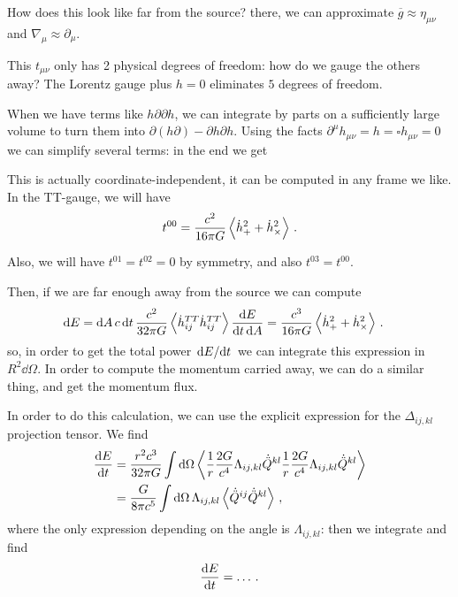 \documentclass[main.tex]{subfiles}
\begin{document}
How does this look like far from the source? there, we can approximate \(\overline{g} \approx \eta_{\mu \nu }\) and \(\nabla_{\mu } \approx \partial_{\mu }\). 

This \(t_{\mu \nu }\) only has 2 physical degrees of freedom: how do we gauge the others away? The Lorentz gauge plus \(h=0\) eliminates \(5\) degrees of freedom. 

When we have terms like \(h \partial \partial h\), we can integrate by parts on a sufficiently large volume to turn them into \(\partial(h \partial ) - \partial h \partial h\). 
Using the facts \(\partial^{\mu }h_{\mu \nu } = h = \square h_{\mu \nu } = 0\) we can simplify several terms: in the end we get 
%

This is actually coordinate-independent, it can be computed in any frame we like. In the TT-gauge, we will have 
%
\begin{align}
t^{00 }= \frac{c^2}{16 \pi G} \expval{\dot{h}^2_{+} + \dot{h}^2_{ \times }}
\,.
\end{align}

Also, we will have \(t^{01} = t^{02} =0 \) by symmetry, and also \(t^{03}= t^{00}\). 

Then, if we are far enough away from the source we can compute 
%
\begin{align}
\dd{E} &= \dd{A} c \dd{t} \frac{c^2}{32 \pi G} \expval{\dot{h}^{TT}_{ij}\dot{h}^{TT}_{ij}}
\frac{ \dd{E}}{ \dd{t} \dd{A}} = \frac{c^3}{16 \pi G} \expval{\dot{h}^2_{+} + \dot{h}^2_{ \times }}
\,.
\end{align}
%
so, in order to get the total power \(\dv*{E}{t}\) we can integrate this expression in \(R^2 \dd{\Omega }\). 
In order to compute the momentum carried away, we can do a similar thing, and get the momentum flux. 

In order to do this calculation, we can use the explicit expression for the \(\Delta_{ij,kl}\) projection tensor. We find 
%
\begin{subequations}
\begin{align}
\dv{E}{t} &= \frac{r^2c^{3}}{32 \pi G} \int \dd{\Omega }
\expval{
\frac{1}{r} \frac{2G}{c^{4}} \Lambda_{ij,kl} \dot{\ddot{Q}}^{kl}
\frac{1}{r} \frac{2G}{c^{4}} \Lambda_{ij,kl} \dot{\ddot{Q}}^{kl}
}  \\
&=\frac{G}{8 \pi c^{5}} \int \dd{\Omega }
\Lambda_{ij, kl} \expval{\dot{\ddot{Q}}^{ij} \dot{\ddot{Q}}^{kl}}
\,,
\end{align}
\end{subequations}
%
where the only expression depending on the angle is \(\Lambda_{ij, kl} \): then we integrate and find 
%
\begin{align}
\dv{E}{t} = \dots
\,.
\end{align}
\end{document}
